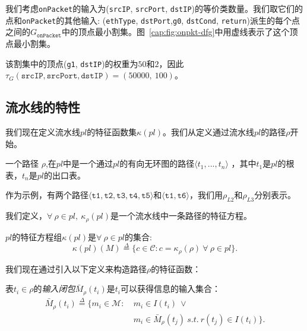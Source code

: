 我们考虑\texttt{onPacket}的输入为(\texttt{srcIP}, \texttt{srcPort}, \texttt{dstIP})的等价类数量。我们取它们的点和\texttt{onPacket}的其他输入: (\texttt{ethType}, \texttt{dstPort},\texttt{g0}, \texttt{dstCond}, \texttt{return})派生的每个点之间的$G_\texttt{onPacket}$中的顶点最小割集。图~\ref{cap:fig:onpkt-dfg}中用虚线表示了这个顶点最小割集。


该割集中的顶点(\texttt{g1}, \texttt{dstIP})的权重为$50$和$2$，因此$\tau_G(\texttt{srcIP}, \texttt{srcPort}, \texttt{dstIP}) = (50000,\ 100)$。



\subsection{流水线的特性}
我们现在定义流水线$pl$的特征函数集$\kappa(pl)$。我们从定义通过流水线$pl$的路径$\rho$开始。


\begin{definition}
一个路径 $\rho$,在$pl$中是一个通过$pl$的有向无环图的路径$\langle t_1, ..., t_n \rangle$ ，其中$t_1$是$pl$的根表，$t_n$是$pl$的出口表。

\end{definition}

作为示例，\exampledp 有两个路径$\langle \texttt{t1}, \texttt{t2}, \texttt{t3}, \texttt{t4}, \texttt{t5} \rangle$和$\langle \texttt{t1}, \texttt{t6} \rangle$，我们用$\rho_{L2}$和$\rho_{L3}$分别表示。

我们定义，$\forall\ \rho \in pl,\ \kappa_\rho(pl)$是一个流水线中一条路径的特征方程。


\begin{definition} $pl$的特征方程组$\kappa(pl)$是$\forall\ \rho \in pl$的集合:
\begin{equation*}
\kappa(pl)(M) \overset{\Delta}{=} \{c \in \mathcal{C} : c = \kappa_\rho(\rho)\ \forall\ \rho \in pl\}.
\end{equation*}
\end{definition}

我们现在通过引入以下定义来构造路径$\rho$的特征函数：

\begin{definition} 表$t_i \in \rho$的{\em 输入闭包$\bar{M}_\rho(t_i)$}是$t_i$可以获得信息的输入集合：
\begin{equation*}
\begin{split}
\bar{M}_\rho(t_i) \overset{\Delta}{=} \{m_i \in \mathcal{M} :\ &m_i \in I(t_i)\ \vee\\ &m_i \in \bar{M}_\rho(t_j)\ s.t.\ r(t_j) \in I(t_i)\}.
\end{split}
\end{equation*}
\end{definition}

